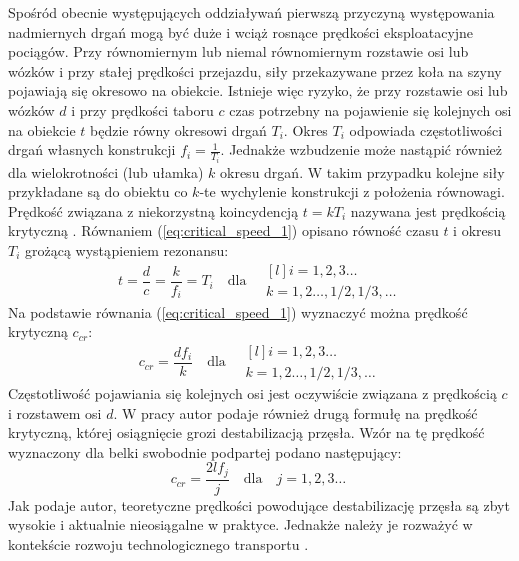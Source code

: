 Spośród obecnie występujących oddziaływań pierwszą przyczyną występowania nadmiernych drgań mogą być duże i wciąż rosnące prędkości eksploatacyjne pociągów. Przy równomiernym lub niemal równomiernym rozstawie osi lub wózków i przy stałej prędkości przejazdu, siły przekazywane przez koła na szyny pojawiają się okresowo na obiekcie. Istnieje więc ryzyko, że przy rozstawie osi lub wózków $d$ i przy prędkości taboru $c$ czas potrzebny na pojawienie się kolejnych osi na obiekcie $t$ będzie równy okresowi drgań $T_i$. Okres $T_i$ odpowiada częstotliwości drgań własnych konstrukcji $f_i=\frac{1}{T_i}$. Jednakże wzbudzenie może nastąpić również dla wielokrotności (lub ułamka) $k$ okresu drgań. W takim przypadku kolejne siły przykładane są do obiektu co $k$-te wychylenie konstrukcji z położenia równowagi. Prędkość związana z niekorzystną koincydencją $t=kT_i$ nazywana jest prędkością krytyczną . Równaniem (\ref{eq:critical_speed_1}) opisano równość czasu $t$ i okresu $T_i$ grożącą wystąpieniem rezonansu:
\begin{equation} \label{eq:critical_speed_1}
	t=\frac{d}{c}=\frac{k}{f_i}=T_i \quad\text{dla}\quad
	\begin{matrix*}[l]
		i=1,2,3\dots\ \\
		k=1,2\dots,1/2,1/3,\dots
	\end{matrix*}
\end{equation}
Na podstawie równania (\ref{eq:critical_speed_1}) wyznaczyć można prędkość krytyczną $c_{cr}$:
\begin{equation} \label{eq:critical_speed_2}
	c_{cr}=\frac{df_i}{k}\quad \text{dla}\quad
	\begin{matrix*}[l]
		i=1,2,3\dots\ \\
		k=1,2\dots,1/2,1/3,\dots
	\end{matrix*}
\end{equation}
Częstotliwość pojawiania się kolejnych osi jest oczywiście związana z prędkością $c$ i rozstawem osi $d$. W pracy \cite{Fryba2001} autor podaje również drugą formułę na prędkość krytyczną, której osiągnięcie grozi destabilizacją przęsła. Wzór na tę prędkość wyznaczony dla belki swobodnie podpartej podano następujący:
\begin{equation} \label{eq:criticla_speed}
	c_{cr}=\frac{2lf_j}{j}\quad\text{dla}\quad j=1,2,3\dots\ 
\end{equation}
Jak podaje autor, teoretyczne prędkości powodujące destabilizację przęsła są zbyt wysokie i aktualnie nieosiągalne w praktyce. Jednakże należy je rozważyć w kontekście rozwoju technologicznego transportu \parencite{Ladislav2008}.

